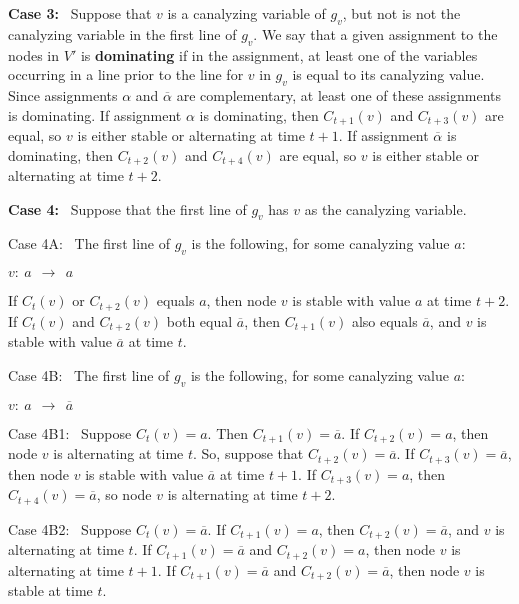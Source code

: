 \medskip

\noindent
\textbf{Case 3:}~ Suppose that $v$ is a canalyzing variable of
$g_v$, but not is not the canalyzing variable in the first line of
$g_v$.  We say that a given assignment to the nodes in $V'$ is {\bf
dominating} if in the assignment, at least one of the variables
occurring in a line prior to the line for $v$ in $g_v$ is equal to
its canalyzing value.  Since assignments $\alpha$  and $\overline{\alpha}$
are complementary, at least one of these assignments is dominating.
If assignment $\alpha$  is dominating, then $C_{t+1}(v)$ and
$C_{t+3}(v)$ are equal, so $v$ is either stable or alternating at
time $t+1$.  If assignment $\overline{\alpha}$  is dominating, then
$C_{t+2}(v)$ and $C_{t+4}(v)$ are equal, so $v$ is either stable
or alternating at time $t+2$.

\noindent \textbf{Case 4:}~ Suppose that the first line of $g_v$
has $v$ as the canalyzing variable.

\begin{description}
\item{\textsf{Case 4A:}}~ The first line of $g_v$ is the following, 
for some canalyzing value $a$:

\noindent
\hspace*{1.1in} $v:~ a ~~\longrightarrow~~ a$

\medskip

If $C_t(v)$ or $C_{t+2}(v)$ equals $a$, then node $v$ is stable
with value $a$ at time $t+2$.  If  $C_t(v)$  and $C_{t+2}(v)$ both
equal $\overline{a}$, then $C_{t+1}(v)$ also equals $\overline{a}$,
and $v$ is stable with value $\overline{a}$ at time $t$.

\item{\textsf{Case 4B:}}~ The first line of $g_v$ is the following,
for some canalyzing value $a$:

\noindent
\hspace*{1.1in} $v:~ a ~~\longrightarrow~~ \overline{a}$


\begin{description}
\item{\textsf{Case 4B1:}}~ Suppose $C_t(v) = a$. 
Then $C_{t+1}(v) =  \overline{a}$. 
If $C_{t+2}(v) = a$, then node $v$ is alternating at time $t$.
So, suppose that $C_{t+2}(v) = \overline{a}$.
If $C_{t+3}(v) = \overline{a}$,
then node $v$ is stable with value $\overline{a}$ at time $t+1$.
If $C_{t+3}(v) = a$, then $C_{t+4}(v) = \overline{a}$,
so node $v$ is alternating at time $t+2$.

\item{\textsf{Case 4B2:}}~ Suppose $C_t(v) = \overline{a}$.
If $C_{t+1}(v) = a$, then $C_{t+2}(v) = \overline{a}$,
and $v$ is alternating at time $t$.
If $C_{t+1}(v) = \overline{a}$ and $C_{t+2}(v) = a$, then node $v$ is alternating at time $t+1$.
If $C_{t+1}(v) = \overline{a}$ and $C_{t+2}(v) =  \overline{a}$, then node $v$ is stable at time $t$.
\end{description} %
\end{description}


